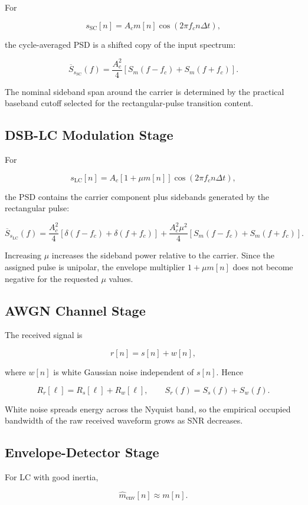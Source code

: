 \documentclass[11pt]{article}
\begin{document}
For

\[
s_{\mathrm{SC}}[n]=A_c m[n]\cos(2\pi f_c n\Delta t),
\]

the cycle-averaged PSD is a shifted copy of the input spectrum:

\[
\overline{S}_{s_{\mathrm{SC}}}(f)=\frac{A_c^2}{4}\left[S_m(f-f_c)+S_m(f+f_c)\right].
\]

The nominal sideband span around the carrier is determined by the practical baseband cutoff selected for the rectangular-pulse transition content.

\subsection{DSB-LC Modulation Stage}

For

\[
s_{\mathrm{LC}}[n]=A_c[1+\mu m[n]]\cos(2\pi f_c n\Delta t),
\]

the PSD contains the carrier component plus sidebands generated by the rectangular pulse:

\[
\overline{S}_{s_{\mathrm{LC}}}(f)
=\frac{A_c^2}{4}\left[\delta(f-f_c)+\delta(f+f_c)\right]
+\frac{A_c^2\mu^2}{4}\left[S_m(f-f_c)+S_m(f+f_c)\right].
\]

Increasing $\mu$ increases the sideband power relative to the carrier. Since the assigned pulse is unipolar, the envelope multiplier $1+\mu m[n]$ does not become negative for the requested $\mu$ values.

\subsection{AWGN Channel Stage}

The received signal is

\[
r[n]=s[n]+w[n],
\]

where $w[n]$ is white Gaussian noise independent of $s[n]$. Hence

\[
R_r[\ell]=R_s[\ell]+R_w[\ell],
\qquad
S_r(f)=S_s(f)+S_w(f).
\]

White noise spreads energy across the Nyquist band, so the empirical occupied bandwidth of the raw received waveform grows as SNR decreases.

\subsection{Envelope-Detector Stage}

For LC with good inertia,

\[
\widehat{m}_{\mathrm{env}}[n]\approx m[n].
\]
\end{document}
